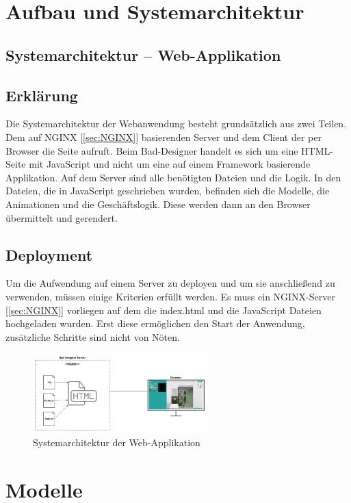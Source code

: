 \chapter{Aufbau und Systemarchitektur}

\section{Systemarchitektur – Web-Applikation}

\section*{Erklärung}
Die Systemarchitektur der Webanwendung besteht grundsätzlich aus zwei Teilen. Dem auf NGINX [\ref{sec:NGINX}] basierenden Server und dem Client der per Browser die Seite aufruft. Beim Bad-Designer handelt es sich um eine HTML-Seite mit JavaScript und nicht um eine auf einem Framework basierende Applikation.
Auf dem Server sind alle benötigten Dateien und die Logik. In den Dateien, die in JavaScript geschrieben wurden, befinden sich die Modelle, die Animationen und die Geschäftslogik. Diese werden dann an den Browser übermittelt und gerendert.

\section*{Deployment}
Um die Aufwendung auf einem Server zu deployen und um sie anschließend zu verwenden, müssen einige Kriterien erfüllt werden. Es muss ein NGINX-Server [\ref{sec:NGINX}] vorliegen auf dem die index.html und die JavaScript Dateien hochgeladen wurden. Erst diese ermöglichen den Start der Anwendung, zusätzliche Schritte sind nicht von Nöten.

\begin{figure}[b]
    \centering
    \includegraphics[width=0.6\textwidth]{images/DA-SysArch.jpg}
    \caption{Systemarchitektur der Web-Applikation}
\end{figure}




\chapter{Modelle}
